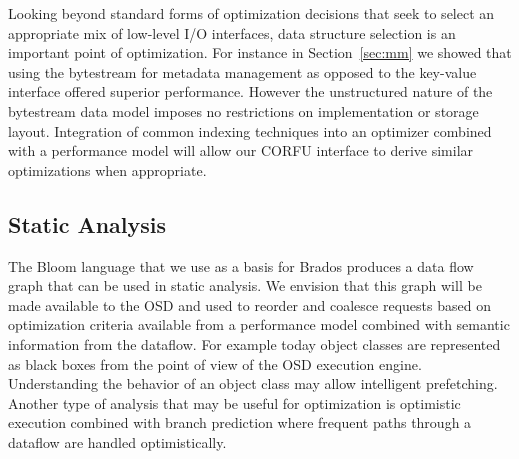 Looking beyond standard forms of optimization decisions that seek to select
an appropriate mix of low-level I/O interfaces, data structure selection is an
important point of optimization. For instance in Section~\ref{sec:mm} we
showed that using the bytestream for metadata management as opposed to the
key-value interface offered superior performance. However the unstructured
nature of the bytestream data model imposes no restrictions on implementation
or storage layout. Integration of common indexing techniques into an optimizer
combined with a performance model will allow our CORFU interface to derive
similar optimizations when appropriate.

\subsection{Static Analysis}

The Bloom language that we use as a basis for Brados
produces a data flow graph that can be used in static analysis. We envision
that this graph will be made available to the OSD and used to reorder and
coalesce requests based on optimization criteria available from a performance
model combined with semantic information from the dataflow. For example today
object classes are represented as black boxes from the point of view of the
OSD execution engine.  Understanding the behavior of an object class may allow
intelligent prefetching. Another type of analysis that may be useful for
optimization is optimistic execution combined with branch prediction where
frequent paths through a dataflow are handled optimistically.
